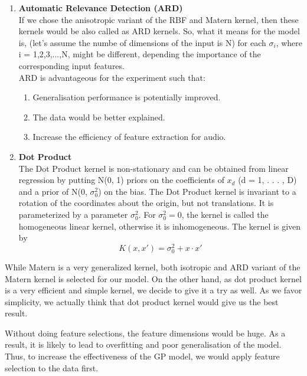 \documentclass{article}
\begin{document}
\begin{enumerate}
\begin{enumerate}
			\item \textbf{Automatic Relevance Detection (ARD)}\\
			If we chose the anisotropic variant of the RBF and Matern kernel, then these kernels would be also called as ARD kernels. 
			So, what it means for the model is, (let's assume the numbe of dimensions of the input is N) for each \(\sigma_{i}\), where i = 1,2,3,...,N, 
			might be different, depending the importance of the corresponding input features. \\

			ARD is advantageous for the experiment such that: \cite{Cawley2014}
			\begin{enumerate}
				\item Generalisation performance is potentially improved.
				\item The data would be better explained.
				\item Increase the efficiency of feature extraction for audio.
			\end{enumerate}
			
			\item \textbf{Dot Product}\\
			The Dot Product kernel is non-stationary and can be obtained from linear regression by putting N(0, 1) priors on the coefficients 
			of \(x_{d}\) (d = 1, . . . , D) and a prior of N(0, \(\sigma_{0}^{2}\)) on the bias. 
			The Dot Product kernel is invariant to a rotation of the coordinates about the origin, but not translations. 
			It is parameterized by a parameter \(\sigma_{0}^{2}\). For \(\sigma_{0}^{2} = 0\), 
			the kernel is called the homogeneous linear kernel, otherwise it is inhomogeneous. The kernel is given by
			\begin{equation}\label{eq:kernel_dp}
				K(x,x') = \sigma_{0}^{2} + x \cdot x'  
			\end{equation}
		\end{enumerate}

		While Matern is a very generalized kernel, both isotropic and ARD variant of the Matern kernel is selected for our model. 
		On the other hand, as dot product kernel is a very efficient and simple kernel, we decide to give it a try as well. 
		As we favor simplicity, we actually think that dot product kernel would give us the best result.
	\end{enumerate}

	Without doing feature selections, the feature dimensions would be huge. 
	As a result, it is likely to lead to overfitting and poor generalisation of the model. \cite{Cawley2014} 
	Thus, to increase the effectiveness of the GP model, we would apply feature selection to the data first.
\end{document}
